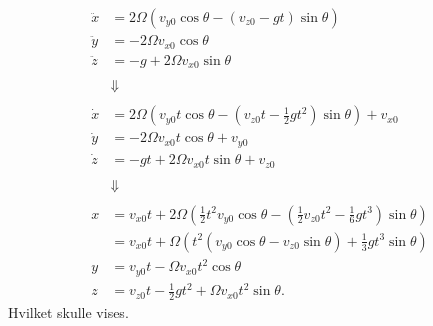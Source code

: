 \documentclass[12pt]{article}
\theoremstyle{definition}
\begin{document}
\begin{align*}
  \ddot{x} &= 2\Omega(v_{y0} \cos \theta - (v_{z0} - gt) \sin \theta) \\
  \ddot{y} &= -2\Omega v_{x0} \cos \theta \\
  \ddot{z} &= -g + 2\Omega v_{x0} \sin\theta \\
  \\
           &\Downarrow \\
  \\
  \dot{x} &= 2\Omega (v_{y0}t \cos \theta - (v_{z0}t - \frac{1}{2}gt^2)\sin\theta) + v_{x0}\\
  \dot{y} &= -2\Omega v_{x0}t \cos \theta + v_{y0}\\
  \dot{z} &= -gt + 2\Omega v_{x0}t \sin\theta + v_{z0}\\
  \\
          &\Downarrow \\
  \\
  x &= v_{x0}t + 2\Omega \left( \frac{1}{2}t^2 v_{y0} \cos\theta - \left( \frac{1}{2}v_{z0}t^2 - \frac{1}{6}gt^3 \right) \sin \theta \right) \\
    &= v_{x0}t + \Omega \left( t^2 \left( v_{y0}\cos\theta - v_{z0} \sin \theta \right) + \frac{1}{3} gt^3 \sin\theta \right) \\
  y &= v_{y0}t -\Omega v_{x0} t^2 \cos \theta \\
  z &= v_{z0}t -\frac{1}{2}gt^2 + \Omega v_{x0}t^2 \sin \theta
.\end{align*}
Hvilket skulle vises.
\end{document}
